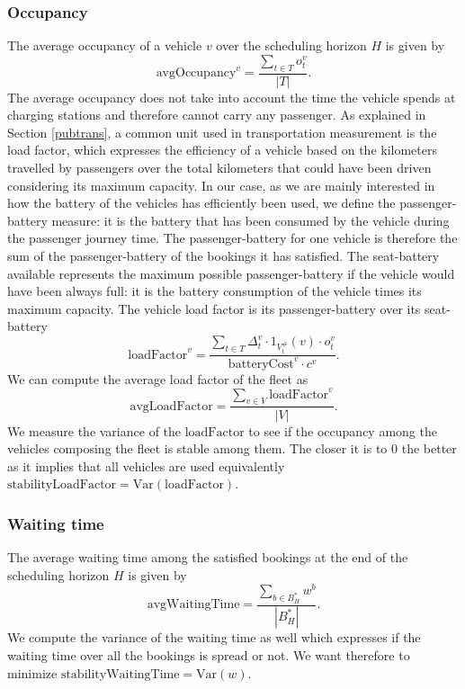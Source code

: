 \documentclass[12pt,a4paper]{article}
\begin{document}
\subsubsection{Occupancy}
The average occupancy of a vehicle $v$ over the scheduling horizon $H$ is given by
$$\text{avgOccupancy}^{v} = \frac{\sum_{t \in T}o^{v}_{t}}{|T|}.$$
The average occupancy does not take into account the time the vehicle spends at charging stations and therefore cannot carry any passenger. As explained in Section \ref{pubtrans}, a common unit used in transportation  measurement is the load factor, which expresses the efficiency of a vehicle based on the kilometers travelled by passengers over the total kilometers that could have been driven considering its maximum capacity. In our case, as we are mainly interested in how the battery of the vehicles has efficiently been used, we define the passenger-battery measure: it is the battery that has been consumed by the vehicle during the passenger journey time. The passenger-battery for one vehicle is therefore the sum of the passenger-battery of the bookings it has satisfied. The seat-battery available represents the maximum possible passenger-battery if the vehicle would have been always full: it is the battery consumption of the vehicle times its maximum capacity. The vehicle load factor is its passenger-battery over its seat-battery
$$\text{loadFactor}^{v} = \frac{\sum_{t \in T} \Delta^{v}_{t} \cdot 1_{V^{\#}_{t}}(v) \cdot o^{v}_{t}}{\text{batteryCost}^{v} \cdot c^{v}}.$$
We can compute the average load factor of the fleet as
$$\text{avgLoadFactor} = \frac{\sum_{v \in V}\text{loadFactor}^{v}}{|V|}.$$
We measure the variance of the $\text{loadFactor}$ to see if the occupancy among the vehicles composing the fleet is stable among them. The closer it is to 0 the better as it implies that all vehicles are used equivalently $\text{stabilityLoadFactor} = \text{Var}(\text{loadFactor}).$
\subsubsection{Waiting time}
The average waiting time among the satisfied bookings at the end of the scheduling horizon $H$ is given by
$$\text{avgWaitingTime} = \frac{\sum_{b \in B^{*}_{H}}w^{b}}{|B^{*}_{H}|}.$$
We compute the variance of the waiting time as well which expresses if the waiting time over all the bookings is spread or not. We want therefore to minimize $\text{stabilityWaitingTime} = \text{Var}(w)$.
\end{document}
